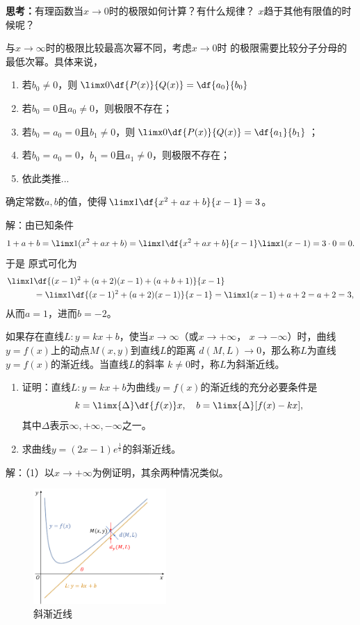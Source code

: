 {\bf 思考：}有理函数当$x\to 0$时的极限如何计算？有什么规律？
$x$趋于其他有限值的时候呢？

\ifhint
	与$x\to\infty$时的极限比较最高次幂不同，考虑$x\to0$时
	的极限需要比较分子分母的最低次幂。具体来说，
	\begin{enumerate}[(1)]
		\setlength{\itemindent}{1cm}
		\item 若$b_0\ne 0$，则$\limx0\df{P(x)}{Q(x)}=\df{a_0}{b_0}$
		\item 若$b_0=0$且$a_0\ne 0$，则极限不存在；
		\item 若$b_0=a_0=0$且$b_1\ne0$，则$\limx0\df{P(x)}{Q(x)}=\df{a_1}{b_1}$；
		\item 若$b_0=a_0=0$，$b_1=0$且$a_1\ne 0$，则极限不存在；
		\item 依此类推...
	\end{enumerate}
\fi

\bs
\egz 确定常数$a,b$的值，使得$\limx1\df{x^2+ax+b}{x-1}=3$。

解：由已知条件
$$1+a+b=\limx1(x^2+ax+b)=\limx1\df{x^2+ax+b}{x-1}\limx1(x-1)=3\cdot 0=0.$$
于是
原式可化为
\begin{align*}
	\limx1&\df{(x-1)^2+(a+2)(x-1)+(a+b+1)}{x-1}\\
	&=\limx1\df{(x-1)^2+(a+2)(x-1)}{x-1}
	=\limx1(x-1)+a+2=a+2=3,	
\end{align*}
从而$a=1$，进而$b=-2$。\fin

\bs
\egz 如果存在直线$L:y=kx+b$，使当$x\to\infty$（或$x\to+\infty$，
$x\to-\infty$）时，曲线$y=f(x)$上的动点$M(x,y)$到直线$L$的距离
$d(M,L)\to 0$，那么称$L$为直线$y=f(x)$的渐近线。当直线$L$的斜率
$k\ne 0$时，称$L$为斜渐近线。
\begin{enumerate}[(1)]
  \setlength{\itemindent}{1cm}
  \item 证明：直线$L:y=kx+b$为曲线$y=f(x)$的渐近线的充分必要条件是
  $$k=\limx{\Delta}\df{f(x)}x,\quad
  b=\limx{\Delta}[f(x)-kx],$$
  其中$\Delta$表示$\infty,+\infty,-\infty$之一。
  \item 求曲线$y=(2x-1)e^{\frac1x}$的斜渐近线。
\end{enumerate}

解：（1）以$x\to+\infty$为例证明，其余两种情况类似。

\begin{figure}[h]
	\centering
	\includegraphics[width=0.45\textwidth]{./images/ch01/fkxb.pdf}
	\caption{斜渐近线}
	\label{fig:fkxb}
\end{figure}

